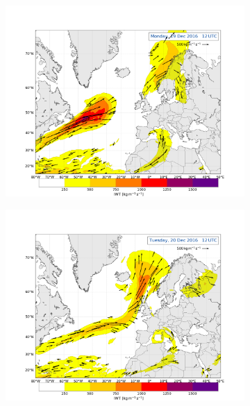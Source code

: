 \begin{figure}[!b]
	\centering
	\begin{subfigure}[b]{0.49\textwidth}
		\includegraphics[trim={4.2cm 3.9cm 4.3cm 5.1cm},clip,
		width=\textwidth]{./fig_Atm_Riv/20161219_12}
		\caption{}\label{fig:AR19}
	\end{subfigure}
	\begin{subfigure}[b]{0.49\textwidth}
		\includegraphics[trim={4.2cm 3.9cm 4.3cm 5.1cm},clip,
		width=\textwidth]{./fig_Atm_Riv/20161220_12}
		\caption{}\label{fig:AR20}
	\end{subfigure}

\end{figure}
